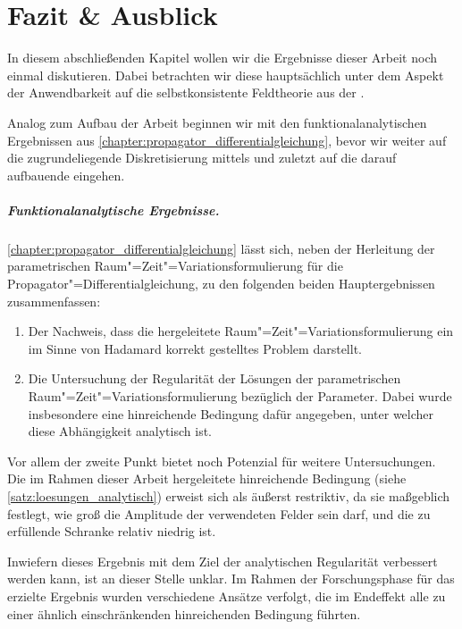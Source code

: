 \documentclass[../main.tex]{subfiles}
\begin{document}
\chapter{Fazit \& Ausblick} %
\label{chapter:ausblick}

In diesem abschließenden Kapitel wollen wir die Ergebnisse dieser Arbeit noch einmal diskutieren.
Dabei betrachten wir diese hauptsächlich unter dem Aspekt der Anwendbarkeit auf die selbstkonsistente Feldtheorie aus der .

Analog zum Aufbau der Arbeit beginnen wir mit den funktionalanalytischen Ergebnissen aus \cref{chapter:propagator_differentialgleichung}, bevor wir weiter auf die zugrundeliegende Diskretisierung mittels  und zuletzt auf die darauf aufbauende  eingehen.

\paragraph{Funktionalanalytische Ergebnisse.} %
\label{par:funktionalanalytische_ergebnisse}

\cref{chapter:propagator_differentialgleichung} lässt sich, neben der Herleitung der parametrischen Raum"=Zeit"=Variationsformulierung für die Propagator"=Differentialgleichung, zu den folgenden beiden Hauptergebnissen zusammenfassen:

\begin{enumerate}[label={\itshape\roman*.},ref={\itshape\roman*}]
    \item
    Der Nachweis, dass die hergeleitete Raum"=Zeit"=Variationsformulierung ein im Sinne von Hadamard korrekt gestelltes Problem darstellt.
    \item
    Die Untersuchung der Regularität der Lösungen der parametrischen Raum"=Zeit"=Variationsformulierung bezüglich der Parameter.
    Dabei wurde insbesondere eine hinreichende Bedingung dafür angegeben, unter welcher diese Abhängigkeit analytisch ist.
\end{enumerate}

Vor allem der zweite Punkt bietet noch Potenzial für weitere Untersuchungen.
Die im Rahmen dieser Arbeit hergeleitete hinreichende Bedingung (siehe \cref{satz:loesungen_analytisch}) erweist sich als äußerst restriktiv, da sie maßgeblich festlegt, wie groß die Amplitude der verwendeten Felder sein darf, und die zu erfüllende Schranke relativ niedrig ist.

Inwiefern dieses Ergebnis mit dem Ziel der analytischen Regularität verbessert werden kann, ist an dieser Stelle unklar.
Im Rahmen der Forschungsphase für das erzielte Ergebnis wurden verschiedene Ansätze verfolgt, die im Endeffekt alle zu einer ähnlich einschränkenden hinreichenden Bedingung führten.
\end{document}
